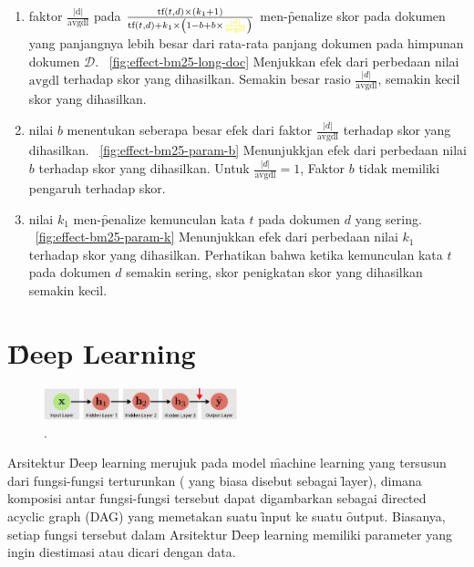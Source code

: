     \begin{enumerate}
        \item faktor $\frac{|\text{d}|}{\text{avgdl}}$ pada $\frac{\text{tf}(t, d) \times (k_1 + 1)}{\text{tf}(t, d) + k_1 \times \left(1 - b + b \times \textcolor{yellow}{\frac{|d|}{\text{avgdl}}}\right)}$ men-\f{penalize} skor pada dokumen yang panjangnya lebih besar dari rata-rata panjang dokumen pada himpunan dokumen $\mathcal{D}$. \pic~\ref{fig:effect-bm25-long-doc} Menjukkan efek dari perbedaan nilai $\text{avgdl}$ terhadap skor yang dihasilkan. Semakin besar rasio $\frac{|d|}{\text{avgdl}}$, semakin kecil skor yang dihasilkan.
        \item nilai $b$ menentukan seberapa besar efek dari faktor $\frac{|d|}{\text{avgdl}}$ terhadap skor yang dihasilkan. \pic~\ref{fig:effect-bm25-param-b} Menunjukkjan efek dari perbedaan nilai $b$ terhadap skor yang dihasilkan. Untuk $\frac{|d|}{\text{avgdl}}=1$, Faktor $b$ tidak memiliki pengaruh terhadap skor.
        \item  nilai $k_1$ men-\f{penalize} kemunculan kata $t$ pada dokumen $d$ yang sering. \pic~\ref{fig:effect-bm25-param-k} Menunjukkan efek dari perbedaan nilai $k_1$ terhadap skor yang dihasilkan. Perhatikan bahwa ketika kemunculan kata $t$ pada dokumen $d$ semakin sering, skor penigkatan skor yang dihasilkan semakin kecil.
    \end{enumerate}
    

\section{\f{Deep Learning}}

    \begin{figure}
        \centering
        \includegraphics[width=0.50\textwidth]{assets/pics/dag-dl.png}
        \caption{\license.}
        \label{fig:deep-learning-FFN-dag}
    \end{figure}

    Arsitektur \f{Deep learning} merujuk pada model \f{machine learning} yang tersusun dari fungsi-fungsi terturunkan ( yang biasa disebut sebagai \f{layer}), dimana komposisi antar fungsi-fungsi tersebut dapat digambarkan sebagai \f{directed acyclic graph} (DAG) yang memetakan suatu \f{input} ke suatu \f{output}. Biasanya, setiap fungsi tersebut dalam Arsitektur \f{Deep learning} memiliki parameter yang ingin diestimasi atau dicari dengan data.
    
